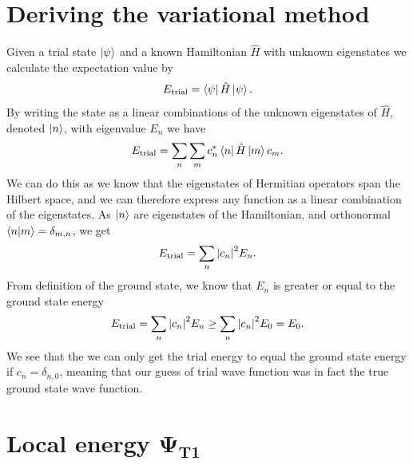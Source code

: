 \documentclass[%
 reprint,
nofootinbib,
aps,
]{revtex4-1}
\begin{document}
\section{Deriving the variational method}\label{sec:appendix}
Given a trial state $\ket{\psi}$ and a known Hamiltonian $\hat{H}$ with unknown eigenstates we calculate the expectation value by
\begin{equation}
  E_{\mathrm{trial}} = \bra{\psi}\hat{H}\ket{\psi}.
\end{equation}
By writing the state as a linear combinations of the unknown eigenstates of $\hat{H}$, denoted $\ket{n}$, with eigenvalue $E_n$ we have
\begin{equation}
  E_{\mathrm{trial}} = \sum_{n}\sum_{m}c_n^{*}\bra{n} \hat{H}\ket{m}c_m.
\end{equation}
We can do this as we know that the eigenstates of Hermitian operators span the Hilbert space, and we can therefore express any function as a linear combination of the eigenstates. As $\ket{n}$ are eigenstates of the Hamiltonian, and orthonormal $\braket{n}{m}=\delta_{m,n}$, we get
\begin{equation}
  E_{\mathrm{trial}} = \sum_n \abs{c_n}^2E_n.
\end{equation}
From definition of the ground state, we know that $E_n$ is greater or equal to the ground state energy
\begin{equation}
  E_{\mathrm{trial}} = \sum_n \abs{c_n}^2E_n \geq \sum_n \abs{c_n}^2E_0  = E_0.
\end{equation}
We see that the we can only get the trial energy to equal the ground state energy if $c_n=\delta_{n,0}$, meaning that our guess of trial wave function was in fact the true ground state wave function.

\section{Local energy $\boldsymbol{\Psi_{T1}}$}\label{sec:appendix_trial_1}
\end{document}
